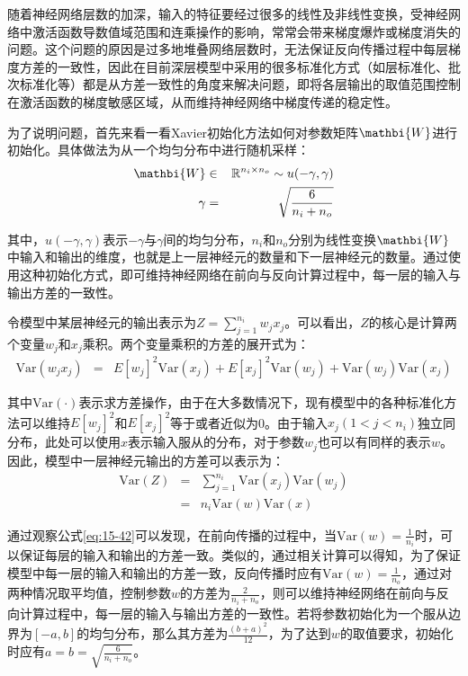 \parinterval 随着神经网络层数的加深，输入的特征要经过很多的线性及非线性变换，受神经网络中激活函数导数值域范围和连乘操作的影响，常常会带来梯度爆炸或梯度消失的问题。这个问题的原因是过多地堆叠网络层数时，无法保证反向传播过程中每层梯度方差的一致性，因此在目前深层模型中采用的很多标准化方式（如层标准化、批次标准化等）都是从方差一致性的角度来解决问题，即将各层输出的取值范围控制在激活函数的梯度敏感区域，从而维持神经网络中梯度传递的稳定性。

\parinterval 为了说明问题，首先来看一看Xavier初始化方法如何对参数矩阵$\mathbi{W}$进行初始化。具体做法为从一个均匀分布中进行随机采样：
\begin{eqnarray}
\mathbi{W} & \in & \mathbb{R}^{n_i\times n_o} \sim u(-\gamma,\gamma) \\
\gamma     & = & \sqrt{\frac{6}{n_i + n_o}}
\label{eq:15-40}
\end{eqnarray}

\noindent 其中，$u(-\gamma,\gamma)$表示$-\gamma$与$\gamma$间的均匀分布，$n_i$和$n_o$分别为线性变换$\mathbi{W}$中输入和输出的维度，也就是上一层神经元的数量和下一层神经元的数量。通过使用这种初始化方式，即可维持神经网络在前向与反向计算过程中，每一层的输入与输出方差的一致性。

\parinterval 令模型中某层神经元的输出表示为$Z=\sum_{j=1}^{n_i}{w_j x_j}$。可以看出，$Z$的核心是计算两个变量$w_j$和$x_j$乘积。两个变量乘积的方差的展开式为：
\begin{eqnarray}
\textrm{Var}(w_j x_j) &=& E[w_j]^2 \textrm{Var}(x_j) + E[x_j]^2 \textrm{Var}(w_j) + \textrm{Var}(w_j)\textrm{Var}(x_j)
\label{eq:15-41}
\end{eqnarray}

\parinterval 其中$\textrm{Var}(\cdot)$表示求方差操作，由于在大多数情况下，现有模型中的各种标准化方法可以维持$E[w_j]^2$和$E[x_j]^2$等于或者近似为0。由于输入$x_j(1<j<n_i)$独立同分布，此处可以使用$x$表示输入服从的分布，对于参数$w_j$也可以有同样的表示$w$。因此，模型中一层神经元输出的方差可以表示为：
\begin{eqnarray}
\textrm{Var}(Z) &=& \sum_{j=1}^{n_i}{\textrm{Var}(x_j) \textrm{Var}(w_j)} \nonumber \\
&=& {n_i}\textrm{Var}({w})\textrm{Var}({x})
\label{eq:15-42}
\end{eqnarray}

\parinterval 通过观察公式\eqref{eq:15-42}可以发现，在前向传播的过程中，当$\textrm{Var}(w)=\frac{1}{n_i}$时，可以保证每层的输入和输出的方差一致。类似的，通过相关计算可以得知，为了保证模型中每一层的输入和输出的方差一致，反向传播时应有$\textrm{Var}(w)=\frac{1}{n_o}$，通过对两种情况取平均值，控制参数$w$的方差为$\frac{2}{n_i+n_o}$，则可以维持神经网络在前向与反向计算过程中，每一层的输入与输出方差的一致性。若将参数初始化为一个服从边界为$[-a,b]$的均匀分布，那么其方差为$\frac{{(b+a)}^2}{12}$，为了达到$w$的取值要求，初始化时应有$a=b=\sqrt{\frac{6}{n_i+n_o}}$。


